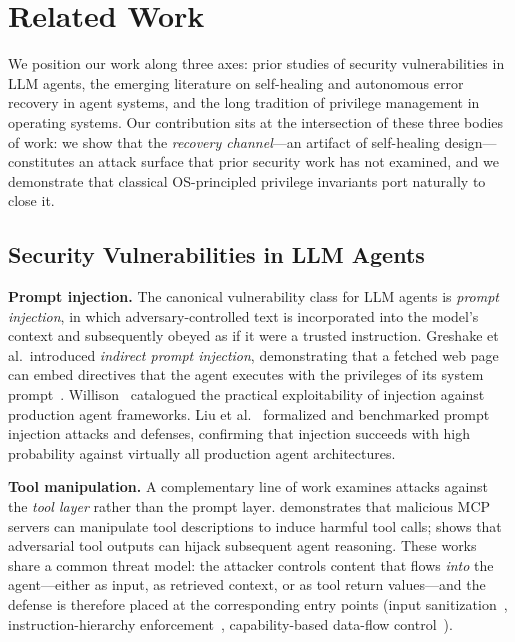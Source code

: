 
\section{Related Work}
\label{sec:related-work}

We position our work along three axes: prior studies of security vulnerabilities in LLM agents, the emerging literature on self-healing and autonomous error recovery in agent systems, and the long tradition of privilege management in operating systems. Our contribution sits at the intersection of these three bodies of work: we show that the \emph{recovery channel}---an artifact of self-healing design---constitutes an attack surface that prior security work has not examined, and we demonstrate that classical OS-principled privilege invariants port naturally to close it.

\subsection{Security Vulnerabilities in LLM Agents}
\label{sec:related-injection}

\textbf{Prompt injection.} The canonical vulnerability class for LLM agents is \emph{prompt injection}, in which adversary-controlled text is incorporated into the model's context and subsequently obeyed as if it were a trusted instruction. Greshake et al.\ introduced \emph{indirect prompt injection}, demonstrating that a fetched web page can embed directives that the agent executes with the privileges of its system prompt~\cite{greshake2023indirect}. Willison~\cite{willison2023prompt} catalogued the practical exploitability of injection against production agent frameworks. Liu et al.~\cite{liu2024formalizing} formalized and benchmarked prompt injection attacks and defenses, confirming that injection succeeds with high probability against virtually all production agent architectures.

\textbf{Tool manipulation.} A complementary line of work examines attacks against the \emph{tool layer} rather than the prompt layer. \cite{tool-poisoning} demonstrates that malicious MCP servers can manipulate tool descriptions to induce harmful tool calls; \cite{tool-slots} shows that adversarial tool outputs can hijack subsequent agent reasoning. These works share a common threat model: the attacker controls content that flows \emph{into} the agent---either as input, as retrieved context, or as tool return values---and the defense is therefore placed at the corresponding entry points (input sanitization~\cite{spotlighting}, instruction-hierarchy enforcement~\cite{instruction-hierarchy}, capability-based data-flow control~\cite{debenedetti2025camel}).

